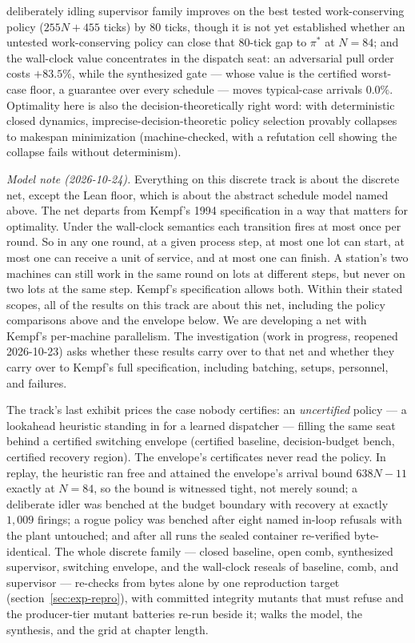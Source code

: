 deliberately idling supervisor family improves on the best tested
work-conserving policy ($255N + 455$ ticks) by $80$ ticks, though
it is not yet established whether an untested work-conserving policy
can close that $80$-tick gap to $\pi^\ast$ at $N = 84$;
and the wall-clock value
concentrates in the dispatch seat: an adversarial pull order costs
$+83.5\%$, while the synthesized gate --- whose value is the
certified worst-case floor, a guarantee over every schedule ---
moves typical-case arrivals $0.0\%$. Optimality here is also the
decision-theoretically right word: with deterministic closed
dynamics, imprecise-decision-theoretic policy selection provably
collapses to makespan minimization (machine-checked, with a
refutation cell showing the collapse fails without determinism).

\emph{Model note (2026-10-24).} Everything on this discrete track is
about the discrete net, except the Lean floor, which is about the
abstract schedule model named above. The net departs from Kempf's 1994
specification in a way that matters for optimality. Under the
wall-clock semantics each transition fires at most once per round.
So in any one round, at a given process step, at most one lot can
start, at most one can receive a unit of service, and at most one can
finish. A station's two machines can still work in the same round on
lots at different steps, but never on two lots at the same step.
Kempf's specification allows both. Within their stated scopes, all of
the results on this track are about this net, including the policy
comparisons above and the envelope below.
We are developing a net with Kempf's per-machine parallelism. The
investigation (work in progress, reopened 2026-10-23) asks whether
these results carry over to that net and whether they carry over to
Kempf's full specification, including batching, setups, personnel,
and failures.

The track's last exhibit prices the case nobody certifies: an
\emph{uncertified} policy --- a lookahead heuristic standing in for
a learned dispatcher --- filling the same seat behind a certified
switching envelope (certified baseline, decision-budget bench,
certified recovery region). The envelope's certificates never read
the policy. In replay, the heuristic ran free and attained the
envelope's arrival bound $638N - 11$ exactly at $N = 84$, so the
bound is witnessed tight, not merely sound; a deliberate idler was
benched at the budget boundary with recovery at exactly $1{,}009$
firings; a rogue policy was benched after eight named in-loop
refusals with the plant untouched; and after all runs the sealed
container re-verified byte-identical. The whole discrete family ---
closed baseline, open comb, synthesized supervisor, switching
envelope, and the wall-clock reseals of baseline, comb, and
supervisor --- re-checks from bytes alone by one reproduction target
(section~\ref{sec:exp-repro}), with committed integrity mutants that
must refuse and the producer-tier mutant batteries re-run beside it;
 walks
the model, the synthesis, and the grid at chapter length.

